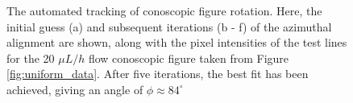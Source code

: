 \begin{figure}
\begin{center}
\hspace{0.3in}
\hspace{0.3in}
\hspace{0.3in}
\end{center}
\caption[Automated tracking of the conoscopic figure rotation]{\label{fig:uniform_rotation}The automated tracking of conoscopic figure rotation. Here, the initial guess (a) and subsequent iterations (b - f) of the azimuthal alignment are shown, along with the pixel intensities of the test lines for the 20 $\mu L/h$ flow conoscopic figure taken from Figure \ref{fig:uniform_data}. After five iterations, the best fit has been achieved, giving an angle of $\phi\approx84^{\circ}$}
\end{figure}


